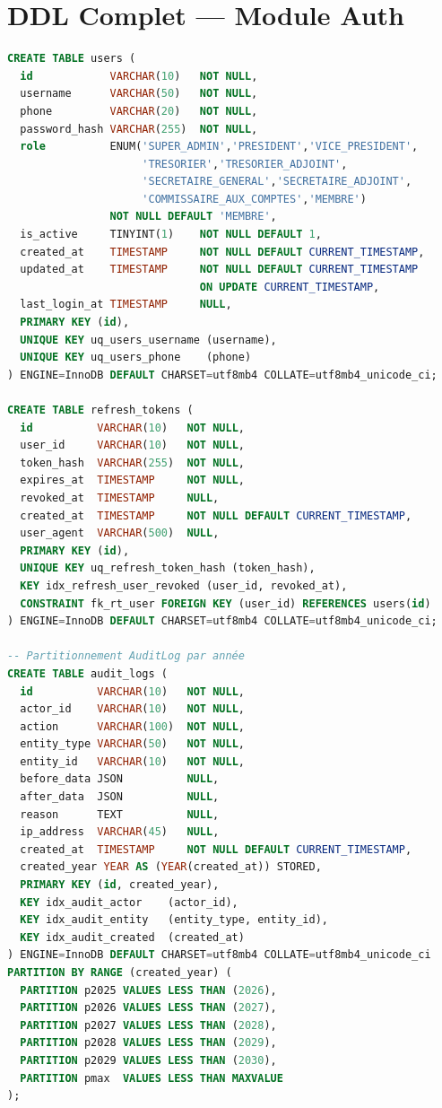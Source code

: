 \documentclass[12pt, a4paper]{report}
\begin{document}
\section{DDL Complet — Module Auth}

\begin{lstlisting}[language=SQL, caption={Tables Auth}]
CREATE TABLE users (
  id            VARCHAR(10)   NOT NULL,
  username      VARCHAR(50)   NOT NULL,
  phone         VARCHAR(20)   NOT NULL,
  password_hash VARCHAR(255)  NOT NULL,
  role          ENUM('SUPER_ADMIN','PRESIDENT','VICE_PRESIDENT',
                     'TRESORIER','TRESORIER_ADJOINT',
                     'SECRETAIRE_GENERAL','SECRETAIRE_ADJOINT',
                     'COMMISSAIRE_AUX_COMPTES','MEMBRE')
                NOT NULL DEFAULT 'MEMBRE',
  is_active     TINYINT(1)    NOT NULL DEFAULT 1,
  created_at    TIMESTAMP     NOT NULL DEFAULT CURRENT_TIMESTAMP,
  updated_at    TIMESTAMP     NOT NULL DEFAULT CURRENT_TIMESTAMP
                              ON UPDATE CURRENT_TIMESTAMP,
  last_login_at TIMESTAMP     NULL,
  PRIMARY KEY (id),
  UNIQUE KEY uq_users_username (username),
  UNIQUE KEY uq_users_phone    (phone)
) ENGINE=InnoDB DEFAULT CHARSET=utf8mb4 COLLATE=utf8mb4_unicode_ci;

CREATE TABLE refresh_tokens (
  id          VARCHAR(10)   NOT NULL,
  user_id     VARCHAR(10)   NOT NULL,
  token_hash  VARCHAR(255)  NOT NULL,
  expires_at  TIMESTAMP     NOT NULL,
  revoked_at  TIMESTAMP     NULL,
  created_at  TIMESTAMP     NOT NULL DEFAULT CURRENT_TIMESTAMP,
  user_agent  VARCHAR(500)  NULL,
  PRIMARY KEY (id),
  UNIQUE KEY uq_refresh_token_hash (token_hash),
  KEY idx_refresh_user_revoked (user_id, revoked_at),
  CONSTRAINT fk_rt_user FOREIGN KEY (user_id) REFERENCES users(id)
) ENGINE=InnoDB DEFAULT CHARSET=utf8mb4 COLLATE=utf8mb4_unicode_ci;

-- Partitionnement AuditLog par année
CREATE TABLE audit_logs (
  id          VARCHAR(10)   NOT NULL,
  actor_id    VARCHAR(10)   NOT NULL,
  action      VARCHAR(100)  NOT NULL,
  entity_type VARCHAR(50)   NOT NULL,
  entity_id   VARCHAR(10)   NOT NULL,
  before_data JSON          NULL,
  after_data  JSON          NULL,
  reason      TEXT          NULL,
  ip_address  VARCHAR(45)   NULL,
  created_at  TIMESTAMP     NOT NULL DEFAULT CURRENT_TIMESTAMP,
  created_year YEAR AS (YEAR(created_at)) STORED,
  PRIMARY KEY (id, created_year),
  KEY idx_audit_actor    (actor_id),
  KEY idx_audit_entity   (entity_type, entity_id),
  KEY idx_audit_created  (created_at)
) ENGINE=InnoDB DEFAULT CHARSET=utf8mb4 COLLATE=utf8mb4_unicode_ci
PARTITION BY RANGE (created_year) (
  PARTITION p2025 VALUES LESS THAN (2026),
  PARTITION p2026 VALUES LESS THAN (2027),
  PARTITION p2027 VALUES LESS THAN (2028),
  PARTITION p2028 VALUES LESS THAN (2029),
  PARTITION p2029 VALUES LESS THAN (2030),
  PARTITION pmax  VALUES LESS THAN MAXVALUE
);
\end{lstlisting}
\end{document}
